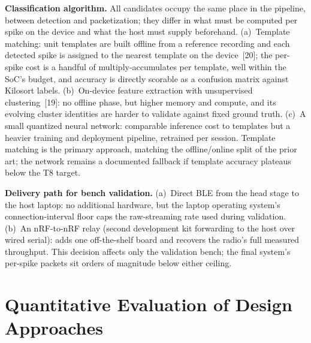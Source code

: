 \documentclass[11pt]{article}
\begin{document}
\textbf{Classification algorithm.} All candidates occupy the same place in the pipeline,
between detection and packetization; they differ in what must be computed per spike on
the device and what the host must supply beforehand. (a)~Template matching: unit
templates are built offline from a reference recording and each detected spike is
assigned to the nearest template on the device~[20]; the per-spike cost is a handful of
multiply-accumulates per template, well within the SoC's budget, and accuracy is directly
scorable as a confusion matrix against Kilosort labels. (b)~On-device feature extraction
with unsupervised clustering~[19]: no offline phase, but higher memory and compute, and
its evolving cluster identities are harder to validate against fixed ground truth.
(c)~A small quantized neural network: comparable inference cost to templates but a
heavier training and deployment pipeline, retrained per session. Template matching is
the primary approach, matching the offline/online split of the prior art; the network
remains a documented fallback if template accuracy plateaus below the T8 target.

\textbf{Delivery path for bench validation.} (a)~Direct BLE from the head stage to the
host laptop: no additional hardware, but the laptop operating system's connection-interval
floor caps the raw-streaming rate used during validation. (b)~An nRF-to-nRF relay
(second development kit forwarding to the host over wired serial): adds one
off-the-shelf board and recovers the radio's full measured throughput. This decision
affects only the validation bench; the final system's per-spike packets sit orders of
magnitude below either ceiling.

\section{Quantitative Evaluation of Design Approaches}\label{sec:quant}
\end{document}
